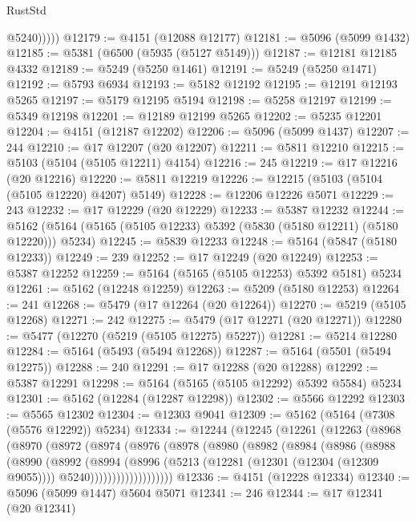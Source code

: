 \begin{lexlean}{RustStd}
\begin{coremodule}
              @5240)))))
@12179 := @4151 (@12088 @12177)
@12181 := @5096 (@5099 @1432)
@12185 := @5381 (@6500 (@5935 (@5127 @5149)))
@12187 := @12181 @12185 @4332
@12189 := @5249 (@5250 @1461)
@12191 := @5249 (@5250 @1471)
@12192 := @5793 @6934
@12193 := @5182 @12192
@12195 := @12191 @12193 @5265
@12197 := @5179 @12195 @5194
@12198 := @5258 @12197
@12199 := @5349 @12198
@12201 := @12189 @12199 @5265
@12202 := @5235 @12201
@12204 := @4151 (@12187 @12202)
@12206 := @5096 (@5099 @1437)
@12207 := 244
@12210 := @17 @12207 (@20 @12207)
@12211 := @5811 @12210
@12215 := @5103 (@5104 (@5105 @12211) @4154)
@12216 := 245
@12219 := @17 @12216 (@20 @12216)
@12220 := @5811 @12219
@12226 := @12215 (@5103 (@5104 (@5105 @12220) @4207) @5149)
@12228 := @12206 @12226 @5071
@12229 := 243
@12232 := @17 @12229 (@20 @12229)
@12233 := @5387 @12232
@12244 := @5162 (@5164 (@5165 (@5105 @12233) @5392 (@5830 (@5180 @12211) (@5180 @12220))) @5234)
@12245 := @5839 @12233
@12248 := @5164 (@5847 (@5180 @12233))
@12249 := 239
@12252 := @17 @12249 (@20 @12249)
@12253 := @5387 @12252
@12259 := @5164 (@5165 (@5105 @12253) @5392 @5181) @5234
@12261 := @5162 (@12248 @12259)
@12263 := @5209 (@5180 @12253)
@12264 := 241
@12268 := @5479 (@17 @12264 (@20 @12264))
@12270 := @5219 (@5105 @12268)
@12271 := 242
@12275 := @5479 (@17 @12271 (@20 @12271))
@12280 := @5477 (@12270 (@5219 (@5105 @12275) @5227))
@12281 := @5214 @12280
@12284 := @5164 (@5493 (@5494 @12268))
@12287 := @5164 (@5501 (@5494 @12275))
@12288 := 240
@12291 := @17 @12288 (@20 @12288)
@12292 := @5387 @12291
@12298 := @5164 (@5165 (@5105 @12292) @5392 @5584) @5234
@12301 := @5162 (@12284 (@12287 @12298))
@12302 := @5566 @12292
@12303 := @5565 @12302
@12304 := @12303 @9041
@12309 := @5162 (@5164 (@7308 (@5576 @12292)) @5234)
@12334 := @12244
    (@12245
      (@12261
        (@12263
          (@8968
            (@8970
              (@8972
                (@8974
                  (@8976
                    (@8978
                      (@8980
                        (@8982
                          (@8984
                            (@8986
                              (@8988
                                (@8990
                                  (@8992
                                    (@8994
                                      (@8996
                                        (@5213
                                          (@12281 (@12301 (@12304 (@12309 @9055))))
                                          @5240)))))))))))))))))))
@12336 := @4151 (@12228 @12334)
@12340 := @5096 (@5099 @1447) @5604 @5071
@12341 := 246
@12344 := @17 @12341 (@20 @12341)

\end{coremodule}
\end{lexlean}
